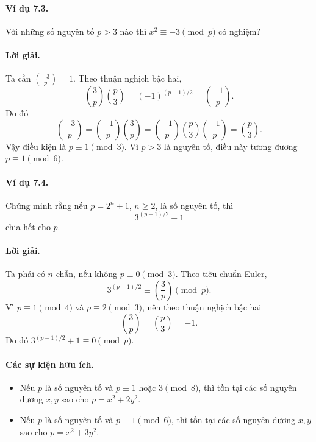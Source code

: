 \documentclass[11pt]{article}
\newcommand{\leg}[2]{\left(\frac{#1}{#2}\right)}
\begin{document}
\paragraph{Ví dụ 7.3.}
Với những số nguyên tố \(p>3\) nào thì \(x^2\equiv-3\pmod p\) có nghiệm?

\paragraph{Lời giải.}
Ta cần \(\leg{-3}p=1\). Theo thuận nghịch bậc hai,
\[
 \leg3p\leg p3=(-1)^{(p-1)/2}=\leg{-1}p.
\]
Do đó
\[
 \leg{-3}p=\leg{-1}p\leg3p
 =\leg{-1}p\leg p3\leg{-1}p=\leg p3.
\]
Vậy điều kiện là \(p\equiv1\pmod3\). Vì \(p>3\) là nguyên tố, điều này tương
đương \(p\equiv1\pmod6\).

\paragraph{Ví dụ 7.4.}
Chứng minh rằng nếu \(p=2^n+1\), \(n\ge2\), là số nguyên tố, thì
\[
 3^{(p-1)/2}+1
\]
chia hết cho \(p\).

\paragraph{Lời giải.}
Ta phải có \(n\) chẵn, nếu không \(p\equiv0\pmod3\). Theo tiêu chuẩn Euler,
\[
 3^{(p-1)/2}\equiv\leg3p\pmod p.
\]
Vì \(p\equiv1\pmod4\) và \(p\equiv2\pmod3\), nên theo thuận nghịch bậc hai
\[
 \leg3p=\leg p3=-1.
\]
Do đó \(3^{(p-1)/2}+1\equiv0\pmod p\).

\paragraph{Các sự kiện hữu ích.}
\begin{itemize}
\item Nếu \(p\) là số nguyên tố và \(p\equiv1\) hoặc \(3\pmod8\), thì tồn tại
các số nguyên dương \(x,y\) sao cho \(p=x^2+2y^2\).
\item Nếu \(p\) là số nguyên tố và \(p\equiv1\pmod6\), thì tồn tại các số
nguyên dương \(x,y\) sao cho \(p=x^2+3y^2\).
\end{itemize}
\end{document}
